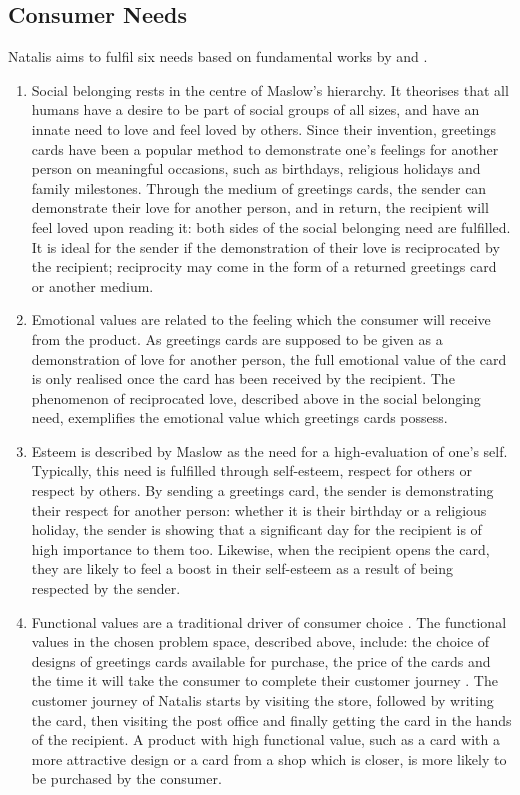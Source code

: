\documentclass[10pt,a4paper]{article}
\begin{document}
\subsection*{Consumer Needs}
\label{subsec:consumerNeeds}
Natalis aims to fulfil six needs based on fundamental works by \citet{maslow1943theory} and \citet{sheth1991we}.
\begin{enumerate}
  \item Social belonging rests in the centre of Maslow's hierarchy. It theorises that all humans have a desire to be part of social groups of all sizes, and have an innate need to love and feel loved by others. Since their invention, greetings cards have been a popular method to demonstrate one's feelings for another person on meaningful occasions, such as birthdays, religious holidays and family milestones. Through the medium of greetings cards, the sender can demonstrate their love for another person, and in return, the recipient will feel loved upon reading it: both sides of the social belonging need are fulfilled. It is ideal for the sender if the demonstration of their love is reciprocated by the recipient; reciprocity may come in the form of a returned greetings card or another medium.
  \item Emotional values are related to the feeling which the consumer will receive from the product. As greetings cards are supposed to be given as a demonstration of love for another person, the full emotional value of the card is only realised once the card has been received by the recipient. The phenomenon of reciprocated love, described above in the social belonging need, exemplifies the emotional value which greetings cards possess.
  \item Esteem is described by Maslow \citep{maslow1943theory} as the need for a high-evaluation of one's self. Typically, this need is fulfilled through self-esteem, respect for others or respect by others. By sending a greetings card, the sender is demonstrating their respect for another person: whether it is their birthday or a religious holiday, the sender is showing that a significant day for the recipient is of high importance to them too. Likewise, when the recipient opens the card, they are likely to feel a boost in their self-esteem as a result of being respected by the sender.
  \item Functional values are a traditional driver of consumer choice \citep{sheth1991we}. The functional values in the chosen problem space, described above, include: the choice of designs of greetings cards available for purchase, the price of the cards and the time it will take the consumer to complete their customer journey \citep{edelman2015competing}. The customer journey of Natalis starts by visiting the store, followed by writing the card, then visiting the post office and finally getting the card in the hands of the recipient. A product with high functional value, such as a card with a more attractive design or a card from a shop which is closer, is more likely to be purchased by the consumer.

\end{enumerate}
\end{document}
